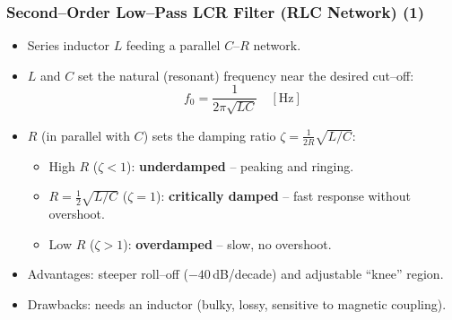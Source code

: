 \begin{frame}
	\frametitle{Second--Order Low--Pass LCR Filter (RLC Network) (1)}
	\begin{itemize}
		\item Series inductor $L$ feeding a parallel $C$--$R$ network.
		\item $L$ and $C$ set the natural (resonant) frequency near the desired cut--off:
		\begin{equation}
			f_0 = \frac{1}{2\pi\sqrt{LC}} \quad [\si{\hertz}]
		\end{equation}
		\item $R$ (in parallel with $C$) sets the damping ratio $\zeta = \frac{1}{2R}\sqrt{L/C}$:
		\begin{itemize}
			\item High $R$ ($\zeta < 1$): \textbf{underdamped} -- peaking and ringing.
			\item $R = \frac{1}{2}\sqrt{L/C}$ ($\zeta = 1$): \textbf{critically damped} -- fast response without overshoot.
			\item Low $R$ ($\zeta > 1$): \textbf{overdamped} -- slow, no overshoot.
		\end{itemize}
		\item Advantages: steeper roll--off ($-40$\,dB/decade) and adjustable ``knee'' region.
		\item Drawbacks: needs an inductor (bulky, lossy, sensitive to magnetic coupling).
	\end{itemize}
\end{frame}
